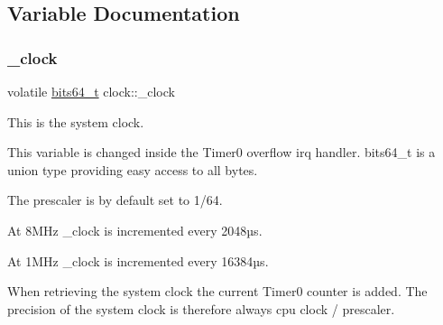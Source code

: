 \subsection{Variable Documentation}
\hypertarget{namespaceclock_a0cfce972d3684eddb3dd61bb0baaf225}{}\label{namespaceclock_a0cfce972d3684eddb3dd61bb0baaf225} 
\subsubsection{\texorpdfstring{\+\_\+clock}{\_clock}}
{\footnotesize\ttfamily volatile \hyperlink{unionbits64__s}{bits64\+\_\+t} clock\+::\+\_\+clock}



This is the system clock. 

This variable is changed inside the {\ttfamily Timer0} overflow irq handler. {\ttfamily bits64\+\_\+t} is a union type providing easy access to all bytes.

The prescaler is by default set to 1/64.
\begin{DoxyItemize}
\item At 8\+M\+Hz \+\_\+clock is incremented every 2\textquotesingle{}048µs.
\item At 1\+M\+Hz \+\_\+clock is incremented every 16\textquotesingle{}384µs.
\end{DoxyItemize}

When retrieving the system clock the current {\ttfamily Timer0} counter is added. The precision of the system clock is therefore always cpu clock / prescaler. 